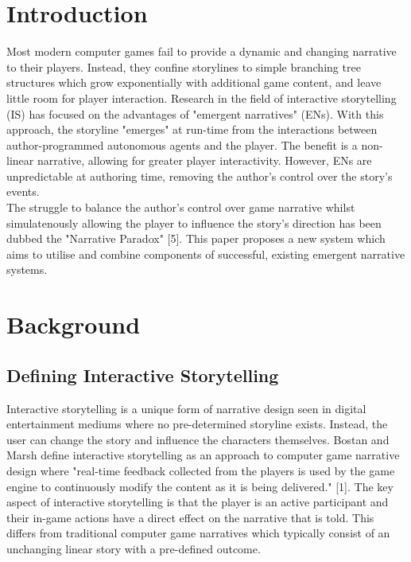 \documentclass{sig-alternate-05-2015}
\begin{document}


\section{Introduction}
Most modern computer games fail to provide a dynamic and changing narrative to their players. Instead, they confine storylines to simple branching tree structures which grow exponentially with additional game content, and leave little room for player interaction. Research in the field of interactive storytelling (IS) has focused on the advantages of "emergent narratives" (ENs). With this approach, the storyline "emerges" at run-time from the interactions between author-programmed autonomous agents and the player. The benefit is a non-linear narrative, allowing for greater player interactivity. However, ENs are unpredictable at authoring time, removing the author's control over the story's events.\\

\noindent The struggle to balance the author's control over game narrative whilst simulatenously allowing the player to influence the story's direction has been dubbed the "Narrative Paradox" [5]. This paper proposes a new system which aims to utilise and combine components of successful, existing emergent narrative systems.

\section{Background}

\subsection{Defining Interactive Storytelling}

Interactive storytelling is a unique form of narrative design seen in digital entertainment mediums where no pre-determined storyline exists. Instead, the user can change the story and influence the characters themselves. Bostan and Marsh define interactive storytelling as an approach to computer game narrative design where "real-time feedback collected from the players is used by the game engine to continuously modify the content as it is being delivered." [1]. The key aspect of interactive storytelling is that the player is an active participant and their in-game actions have a direct effect on the narrative that is told. This differs from traditional computer game narratives which typically consist of an unchanging linear story with a pre-defined outcome.
\end{document}
